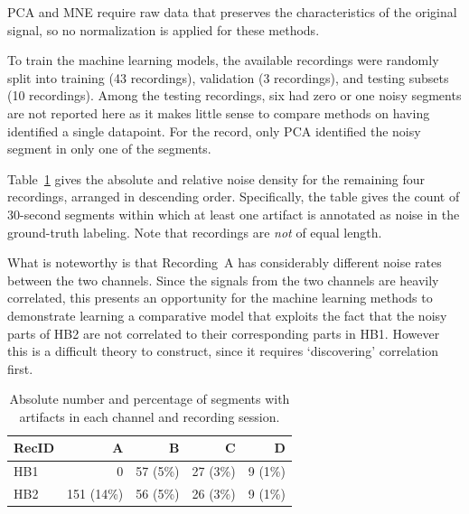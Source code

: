 \documentclass[runningheads]{llncs}
\begin{document}



PCA and MNE require raw data that preserves the characteristics of the
original signal, so no normalization is applied for these methods.

To train the machine learning models, the available recordings were
randomly split into training (43 recordings), validation (3
recordings), and testing subsets (10 recordings). Among the testing
recordings, six had zero or one noisy segments are not reported here
as it makes little sense to compare methods on having identified a
single datapoint. For the record, only PCA identified the noisy
segment in only one of the segments.

Table~\ref{tab2} gives the absolute and relative noise density for the
remaining four recordings, arranged in descending order.
Specifically, the table gives the count of 30-second segments within
which at least one artifact is annotated as noise in the ground-truth
labeling. Note that recordings are \emph{not} of equal length.

What is noteworthy is that Recording~A has considerably different
noise rates between the two channels. Since the signals from the
two channels are heavily correlated, this presents an opportunity
for the machine learning methods to demonstrate learning a
comparative model that exploits the fact that the noisy parts of
HB2 are not correlated to their corresponding parts in HB1. However
this is a difficult theory to construct, since it requires
`discovering' correlation first.


\begin{table}[bt]
\caption{Absolute number and percentage of segments with artifacts in
  each channel and recording session.}
\centering
\renewcommand{\arraystretch}{1.3} %
\begin{tabular}{lrrrr}
\toprule
RecID &  A         &  B       &  C & D \\
\midrule
HB1   &   0        & 57 (5\%) & 27 (3\%) & 9 (1\%) \\

HB2   & 151 (14\%) & 56 (5\%) & 26 (3\%) & 9 (1\%) \\
\bottomrule
\end{tabular}
\label{tab2}
\end{table}
\end{document}
